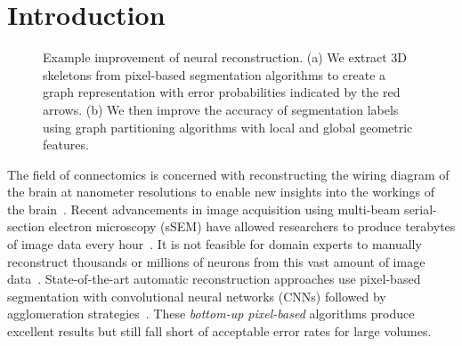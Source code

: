 \section{Introduction}

\begin{figure}[t]
	\caption{Example improvement of neural reconstruction. (a) We extract 3D skeletons from pixel-based segmentation algorithms to create a graph representation with error probabilities indicated by the red arrows. (b) We then improve the accuracy of segmentation labels using graph partitioning algorithms with local and global geometric features.}
	\label{fig:teaser}
\end{figure}

The field of connectomics is concerned with reconstructing the wiring diagram of the brain at nanometer resolutions to enable new insights into the workings of the brain~\cite{haehn2017scalable,kasthuri2015saturated}. Recent advancements in image acquisition using multi-beam serial-section electron microscopy (sSEM) have allowed researchers to produce terabytes of image data every hour~\cite{hildebrand2017whole}. It is not feasible for domain experts to manually reconstruct thousands or millions of neurons from this vast amount of image data~\cite{haehn2014design}. State-of-the-art automatic reconstruction approaches use pixel-based segmentation with convolutional neural networks (CNNs) followed by agglomeration strategies~\cite{seymour2016rhoananet,lee2015recursive,nunez2014graph,parag2017anisotropic,ronneberger2015u,zlateski2015image}. %
These \textit{bottom-up pixel-based} algorithms produce excellent results but still fall short of acceptable error rates for large volumes.

